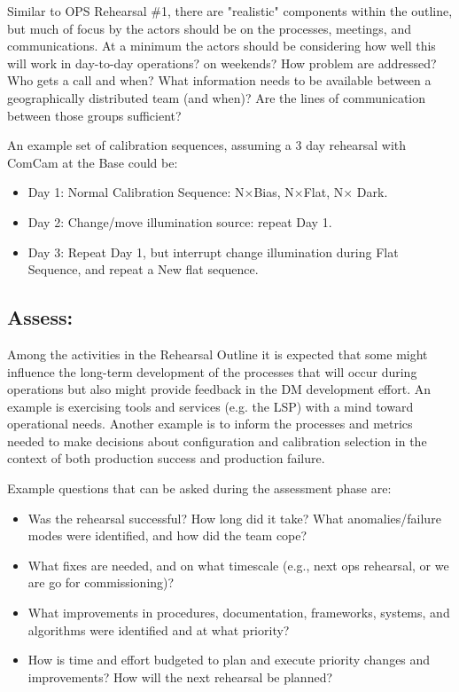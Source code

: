 Similar to OPS Rehearsal \#1, there are "realistic" components within the outline, but 
much of focus by the actors should be on the processes, meetings, and communications.
At a minimum the actors should be considering how well this will work in day-to-day 
operations?  on weekends?  How problem are addressed?  Who gets a call and when?  
What information needs to be available between a geographically distributed team (and when)?  
Are the lines of communication between those groups sufficient?

An example set of calibration sequences, assuming a 3 day rehearsal with ComCam at the Base could be:
\begin{itemize}[topsep=-8pt]
\item Day 1: Normal Calibration Sequence: N$\times$Bias, N$\times$Flat, N$\times$ Dark.
\item Day 2: Change/move illumination source: repeat Day 1.
\item Day 3: Repeat Day 1, but interrupt change illumination during Flat Sequence, and repeat a New flat sequence.
\end{itemize}



\subsection{Assess:}

Among the activities in the Rehearsal Outline it is expected that some might influence 
the long-term development of the processes that will occur during operations but also 
might provide feedback in the DM development effort.  An example is exercising tools 
and services (e.g. the LSP) with a mind toward operational needs.  Another example is 
to inform the processes and metrics needed to make decisions about configuration and 
calibration selection in the context of both production success and production failure.

Example questions that can be asked during the assessment phase are:
\begin{itemize}[topsep=-8pt]
\item Was the rehearsal successful? How long did it take? What anomalies/failure modes were identified, and how did the team cope? 
\item What fixes are needed, and on what timescale (e.g., next ops rehearsal, or we are go for commissioning)? 
\item What improvements in procedures, documentation, frameworks, systems, and algorithms were identified and at what priority?
\item How is time and effort budgeted to plan and execute priority changes and improvements? How will the next rehearsal be planned?
\end{itemize}


\clearpage



